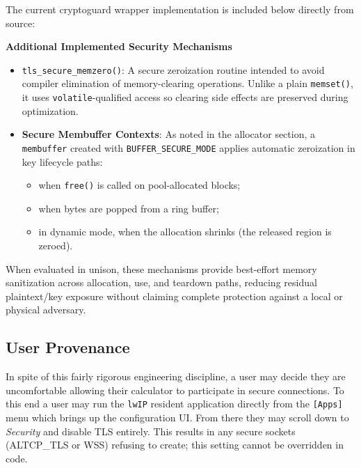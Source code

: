 \documentclass[titlepage]{report}
\begin{document}
	The current cryptoguard wrapper implementation is included below directly from source:
	
	
\textbf{Additional Implemented Security Mechanisms}
\begin{itemize}
	\item \texttt{tls\_secure\_memzero()}: A secure zeroization routine intended to avoid compiler elimination of memory-clearing operations. Unlike a plain \texttt{memset()}, it uses \texttt{volatile}-qualified access so clearing side effects are preserved during optimization.
	\item \textbf{Secure Membuffer Contexts}: As noted in the allocator section, a \texttt{membuffer} created with \texttt{BUFFER\_\allowbreak SECURE\_\allowbreak MODE} applies automatic zeroization in key lifecycle paths:
	\begin{itemize}
		\item when \texttt{free()} is called on pool-allocated blocks;
		\item when bytes are popped from a ring buffer;
		\item in dynamic mode, when the allocation shrinks (the released region is zeroed).
	\end{itemize}
\end{itemize}

When evaluated in unison, these mechanisms provide best-effort memory sanitization across allocation, use, and teardown paths, reducing residual plaintext/key exposure without claiming complete protection against a local or physical adversary.

	\subsection{User Provenance}

	In spite of this fairly rigorous engineering discipline, a user may decide they are uncomfortable allowing their calculator to participate in secure connections. To this end a user may run the \texttt{lwIP} resident application directly from the \texttt{[Apps]} menu which brings up the configuration UI. From there they may scroll down to \textit{Security} and disable TLS entirely. This results in any secure sockets (ALTCP\_TLS or WSS) refusing to create; this setting cannot be overridden in code.
\end{document}
